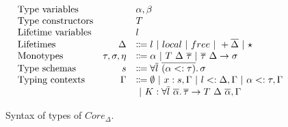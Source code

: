 \documentclass[11pt]{article}
\newcommand{\vor}{~|~}
\newcommand{\ap}{~}
\begin{document}
    \begin{figure}
        \[
            \begin{array}{lrl}
                \text{Type variables}           &                    & \alpha, \beta                                                                                                      \\
                \text{Type constructors}        &                    & T                                                                                                                  \\
                \text{Lifetime variables}       &                    & l                                                                                                                  \\
                \text{Lifetimes}                & \Delta             & \Coloneqq l \vor local \vor free \vor +\overline{\Delta} \vor \star                                                \\
                \text{Monotypes}                & \tau, \sigma, \eta & \Coloneqq \alpha \vor T \ap \Delta \ap \overline{\tau} \vor \overline{\tau}~\Delta \to \sigma                      \\
                \text{Type schemas}             & s                  & \Coloneqq \forall \overline{l}~\overline{(\alpha <: \tau)}\ldotp \sigma                                            \\
                \text{Typing contexts}          & \Gamma             & \Coloneqq \emptyset \vor x : s, \Gamma \vor l <: \Delta, \Gamma \vor \alpha <: \tau, \Gamma                        \\
                &                    & \vor K : \forall \overline{l}\ \overline{\alpha}\ldotp \overline{\tau}\to T \ap\Delta\ap \overline{\alpha}, \Gamma
            \end{array}
        \]
        \caption{Syntax of types of $Core_\Delta$.}
        \label{fig:core-types}
    \end{figure}
\end{document}
